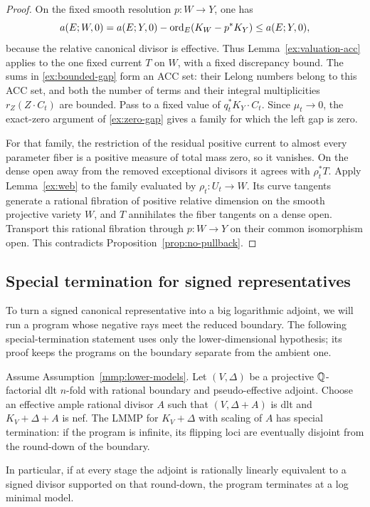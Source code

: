 \begin{proof}
On the fixed smooth resolution \(p:W\to Y\), one has
\[
 a(E;W,0)=a(E;Y,0)
       -\operatorname{ord}_E(K_W-p^*K_Y)\leq a(E;Y,0),
\]
because the relative canonical divisor is effective.
Thus Lemma~\ref{ex:valuation-acc} applies to the one fixed
current \(T\) on \(W\), with a fixed discrepancy bound.
The sums in \eqref{ex:bounded-gap} form an ACC set: their
Lelong numbers belong to this ACC set, and both the number
of terms and their integral multiplicities
\(r_Z(Z\cdot C_t)\) are bounded. Pass to a fixed value of
\(q_t^*K_Y\cdot C_t\). Since \(\mu_t\to0\), the
exact-zero argument of \eqref{ex:zero-gap} gives a family
for which the left gap is zero.

For that family, the restriction of the residual positive
current to almost every parameter fiber is a positive
measure of total mass zero, so it vanishes. On the dense
open away from the removed exceptional divisors it agrees
with \(\rho_t^*T\). Apply Lemma~\ref{ex:web} to the family
evaluated by \(\rho_t:U_t\to W\). Its curve tangents generate
a rational fibration of positive relative dimension on the
smooth projective variety \(W\), and \(T\) annihilates the
fiber tangents on a dense open. Transport this rational
fibration through \(p:W\to Y\) on their common isomorphism
open.
This contradicts Proposition~\ref{prop:no-pullback}.
\end{proof}

\subsection{Special termination for signed representatives}

To turn a signed canonical representative into a big logarithmic
adjoint, we will run a program whose negative rays meet the reduced
boundary. The following special-termination statement uses only the
lower-dimensional hypothesis; its proof keeps the programs on the
boundary separate from the ambient one.

\begin{proposition}
\label{prop:special-termination}
Assume Assumption~\ref{mmp:lower-models}.
Let \((V,\Delta)\) be a projective \(\mathbb{Q}\)-factorial dlt
\(n\)-fold with rational boundary and pseudo-effective adjoint.
Choose an effective ample rational divisor \(A\) such that
\((V,\Delta+A)\) is dlt and \(K_V+\Delta+A\) is nef.
The LMMP for \(K_V+\Delta\) with scaling of \(A\) has special
termination: if the program is infinite, its flipping loci
are eventually disjoint from the round-down of the boundary.

In particular, if at every stage the adjoint is rationally linearly
equivalent to a signed divisor supported on that round-down, the
program terminates at a log minimal model.
\end{proposition}

